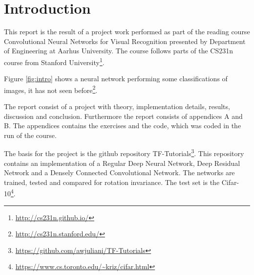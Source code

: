 \chapter{Introduction}
\label{chp:intro}
This report is the result of a project work performed as part of the reading course Convolutional Neural Networks for Visual Recognition presented by Department of Engineering at Aarhus University. The course follows parts of the CS231n course from Stanford University\footnote{\url{http://cs231n.github.io/}}.


Figure \ref{fig:intro} shows a neural network performing some classifications of images, it has not seen before\footnote{\url{http://cs231n.stanford.edu/}}.

The report consist of a project with theory, implementation details, results, discussion and conclusion. Furthermore the report consists of appendices A and B. The appendices contains the exercises and the code, which was coded in the run of the course.

The basis for the project is the github repository TF-Tutorials\footnote{\url{https://github.com/awjuliani/TF-Tutorials}}. This repository contains an implementation of a Regular Deep Neural Network, Deep Residual Network and a Densely Connected Convolutional Network. The networks are trained, tested and compared for rotation invariance. The test set is the Cifar-10\footnote{\url{https://www.cs.toronto.edu/~kriz/cifar.html}}.

